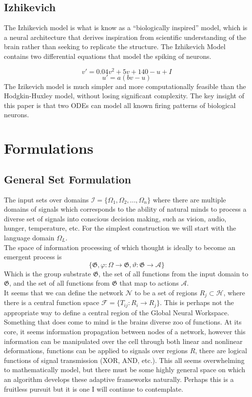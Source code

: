 \documentclass{article}
\begin{document}
\subsection{Izhikevich}
The Izhikevich model is what is know as a ``biologically inspired'' model, which is a neural architecture that derives inspiration from scientific understanding of the brain rather than seeking to replicate the structure. The Izhikevich Model contains two differential equations that model the spiking of neurons.

\[
v' = 0.04v^2 + 5v +140-u+I
\]
\[
u' = a(bv-u)
\]
The Izikevich model is much simpler and more computationally feasible than the Hodgkin-Huxley model, without losing significant complexity. The key insight of this paper is that two ODEs can model all known firing patterns of biological neurons.


\section{Formulations}
\subsection{General Set Formulation}
The input sets over domains $\mathcal{I} =\{ \Omega_1, \Omega_2,..., \Omega_n \}$ where there are multiple domains of signals which corresponds to the ability of natural minds to process a diverse set of signals into conscious decision making, such as vision, audio, hunger, temperature, etc. For the simplest construction we will start with the language domain $\Omega_L$. \\ 

The space of information processing of which thought is ideally to become an emergent process is 
\begin{equation}
    \{ \mathfrak{G}, \varphi: \Omega\to \mathfrak{G}, \vartheta : \mathfrak{G}\to \mathcal{A} \} 
\end{equation}
Which is the group substrate $\mathfrak{G}$, the set of all functions from the input domain to $\mathfrak{G}$, and the set of all functions from $\mathfrak{G}$ that map to actions $\mathcal{A}$. \\

It seems that we can define the network $\mathcal{N}$ to be a set of regions $R_j \subset \mathcal{H}$, where there is a central function space $\mathcal{F} = \{ T_{ij}: R_i \to R_j \}$. This is perhaps not the appropriate way to define a central region of the Global Neural Workspace. Something that does come to mind is the brains diverse zoo of functions. At its core, it seems information propagation between nodes of a network, however this information can be manipulated over the cell through both linear and nonlinear deformations, functions can be applied to signals over regions $R$, there are logical functions of signal transmission (XOR, AND, etc.). This all seems overwhelming to mathematically model, but there must be some highly general space on which an algorithm develops these adaptive frameworks naturally. Perhaps this is a fruitless pursuit but it is one I will continue to contemplate. \\
\end{document}
